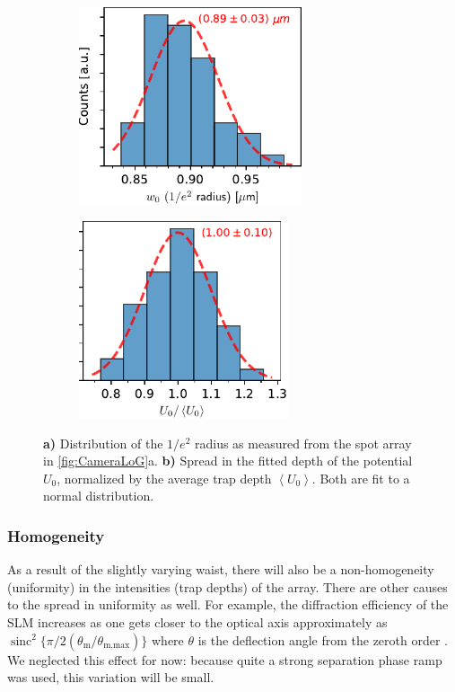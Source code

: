 \begin{figure}
	\begin{subfigure}{.49\linewidth}
		\centering
		\includegraphics[height=5.8cm]{figures/WaistHistogram.pdf}
		\caption{}
		\label{fig:WaistHistogram}
	\end{subfigure}
	\hfill
	\begin{subfigure}{.49\linewidth}
		\centering
		\includegraphics[height=5.8cm]{figures/DepthHistogram.pdf}
		\caption{}
		\label{fig:DepthHistogram}
	\end{subfigure}
	\caption{
	\textsf{\textbf{a)}} Distribution of the $1/e^2$ radius as measured from the spot array in \cref{fig:CameraLoG}a.
   \textsf{\textbf{b)}} Spread in the fitted depth of the potential $U_0$, normalized by the     average trap depth $\left\langle U_0 \right\rangle$.
    Both are fit to a normal distribution.
    }
\end{figure}


\subsubsection*{Homogeneity}

As a result of the slightly varying waist, there will also be a non-homogeneity (uniformity) in the intensities (trap depths) of the array.
There are other causes to the spread in uniformity as well.
For example, the diffraction efficiency of the SLM increases as one gets closer to the optical axis approximately as $\operatorname{sinc}^2\{
\pi/2 (\theta_{\text{m}}/\theta_{\text{m,max}})\}$ where $\theta$ is the deflection angle from the zeroth order \cite{Ebadi2021}.
We neglected this effect for now: because quite a strong separation phase ramp was used, this variation will be small.

